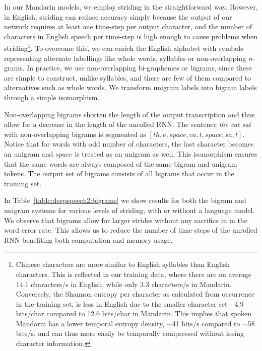 In our Mandarin models, we employ striding in the straightforward way. However,
in English, striding can reduce accuracy simply because the output of our
network requires at least one time-step per output character, and the number of
characters in English speech per time-step is high enough to cause problems
when striding\footnote{Chinese characters are more similar to English syllables
than English characters. This is reflected in our training data, where there
are on average 14.1 characters/s in English, while only 3.3 characters/s in
Mandarin. Conversely, the Shannon entropy per character as calculated from
occurrence in the training set, is less in English due to the smaller character
set---4.9 bits/char compared to 12.6 bits/char in Mandarin. This implies that
spoken Mandarin has a lower temporal entropy density, $\sim$41 bits/s compared
to $\sim$58 bits/s, and can thus more easily be temporally compressed without
losing character information.}. To overcome this, we can enrich the English
alphabet with symbols representing alternate labellings like whole words,
syllables or non-overlapping \emph{n}-grams. In practice, we use
non-overlapping bi-graphemes or bigrams, since these are simple to construct,
unlike syllables, and there are few of them compared to alternatives such as
whole words. We transform unigram labels into bigram labels through a simple
isomorphism.

Non-overlapping bigrams shorten the length of the output transcription and thus
allow for a decrease in the length of the unrolled RNN. The sentence \emph{the
cat sat} with non-overlapping bigrams is segmented as $[th, e, space, ca, t,
space, sa, t ]$. Notice that for words with odd number of characters, the last
character becomes an unigram and $space$ is treated as an unigram as well. This
isomorphism ensures that the same words are always composed of the same bigram
and unigram tokens. The output set of bigrams consists of all bigrams that
occur in the training set. 

In Table~\ref{table:deepspeech2:bigrams} we show results for both the bigram
and unigram systems for various levels of striding, with or without a language
model. We observe that bigrams allow for larger strides without any sacrifice
in in the word error rate. This allows us to reduce the number of time-steps of
the unrolled RNN benefiting both computation and memory usage.

